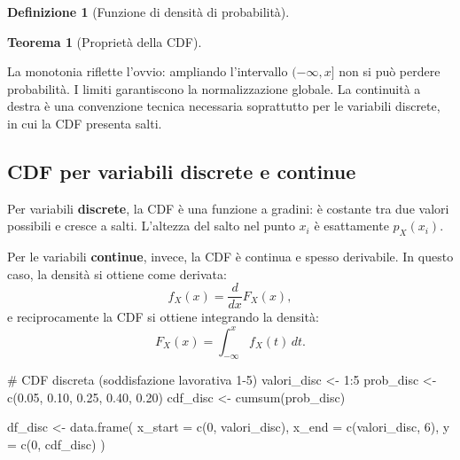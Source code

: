 \documentclass[
  italian,
  letterpaper,
  a4paper,
  11pt,
  open=any]{scrbook}
\newenvironment{Shaded}{\begin{snugshade}}{\end{snugshade}}
\newcommand{\AttributeTok}[1]{\textcolor[rgb]{0.40,0.45,0.13}{#1}}
\newcommand{\CommentTok}[1]{\textcolor[rgb]{0.37,0.37,0.37}{#1}}
\newcommand{\DecValTok}[1]{\textcolor[rgb]{0.68,0.00,0.00}{#1}}
\newcommand{\FloatTok}[1]{\textcolor[rgb]{0.68,0.00,0.00}{#1}}
\newcommand{\FunctionTok}[1]{\textcolor[rgb]{0.28,0.35,0.67}{#1}}
\newcommand{\NormalTok}[1]{\textcolor[rgb]{0.00,0.23,0.31}{#1}}
\newcommand{\OtherTok}[1]{\textcolor[rgb]{0.00,0.23,0.31}{#1}}
\newcommand{\SpecialCharTok}[1]{\textcolor[rgb]{0.37,0.37,0.37}{#1}}
\theoremstyle{plain}
\newtheorem{theorem}{Teorema}[chapter]
\theoremstyle{definition}
\theoremstyle{definition}
\newtheorem{definition}{Definizione}[chapter]
\theoremstyle{remark}
\begin{document}
\begin{definition}[Funzione di densità di
probabilità]
\begin{theorem}[Proprietà della
CDF]
\end{theorem}

La monotonia riflette l'ovvio: ampliando l'intervallo \((-\infty,x]\)
non si può perdere probabilità. I limiti garantiscono la normalizzazione
globale. La continuità a destra è una convenzione tecnica necessaria
soprattutto per le variabili discrete, in cui la CDF presenta salti.

\subsection{CDF per variabili discrete e
continue}\label{cdf-per-variabili-discrete-e-continue}

Per variabili \textbf{discrete}, la CDF è una funzione a gradini: è
costante tra due valori possibili e cresce a salti. L'altezza del salto
nel punto \(x_i\) è esattamente \(p_X(x_i)\).

Per le variabili \textbf{continue}, invece, la CDF è continua e spesso
derivabile. In questo caso, la densità si ottiene come derivata: \[
f_X(x) = \frac{d}{dx} F_X(x),
\] e reciprocamente la CDF si ottiene integrando la densità: \[
F_X(x) = \int_{-\infty}^{x} f_X(t)\,dt.
\]

\begin{Shaded}
\begin{Highlighting}[]
\CommentTok{\# CDF discreta (soddisfazione lavorativa 1{-}5)}
\NormalTok{valori\_disc }\OtherTok{\textless{}{-}} \DecValTok{1}\SpecialCharTok{:}\DecValTok{5}
\NormalTok{prob\_disc }\OtherTok{\textless{}{-}} \FunctionTok{c}\NormalTok{(}\FloatTok{0.05}\NormalTok{, }\FloatTok{0.10}\NormalTok{, }\FloatTok{0.25}\NormalTok{, }\FloatTok{0.40}\NormalTok{, }\FloatTok{0.20}\NormalTok{)}
\NormalTok{cdf\_disc }\OtherTok{\textless{}{-}} \FunctionTok{cumsum}\NormalTok{(prob\_disc)}

\NormalTok{df\_disc }\OtherTok{\textless{}{-}} \FunctionTok{data.frame}\NormalTok{(}
  \AttributeTok{x\_start =} \FunctionTok{c}\NormalTok{(}\DecValTok{0}\NormalTok{, valori\_disc), }
  \AttributeTok{x\_end =} \FunctionTok{c}\NormalTok{(valori\_disc, }\DecValTok{6}\NormalTok{), }
  \AttributeTok{y =} \FunctionTok{c}\NormalTok{(}\DecValTok{0}\NormalTok{, cdf\_disc)}
\NormalTok{)}


\end{Highlighting}
\end{Shaded}
\end{definition}
\end{document}
